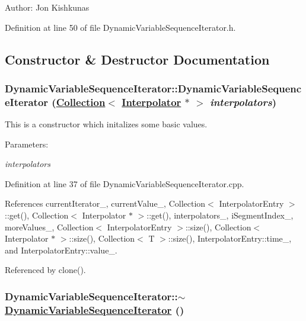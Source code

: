 \begin{Desc}
\item[Author:]Jon Kishkunas \end{Desc}




Definition at line 50 of file Dynamic\-Variable\-Sequence\-Iterator.h.

\subsection{Constructor \& Destructor Documentation}
\hypertarget{classDynamicVariableSequenceIterator_a0}{
\subsubsection[DynamicVariableSequenceIterator]{\setlength{\rightskip}{0pt plus 5cm}Dynamic\-Variable\-Sequence\-Iterator::Dynamic\-Variable\-Sequence\-Iterator (\hyperlink{classCollection}{Collection}$<$ \hyperlink{classInterpolator}{Interpolator} $\ast$ $>$ {\em interpolators})}}
\label{classDynamicVariableSequenceIterator_a0}


This is a constructor which initalizes some basic values. \begin{Desc}
\item[Parameters:]
\begin{description}
\item[{\em interpolators}]\end{description}
\end{Desc}


Definition at line 37 of file Dynamic\-Variable\-Sequence\-Iterator.cpp.

References current\-Iterator\_\-, current\-Value\_\-, Collection$<$ Interpolator\-Entry $>$::get(), Collection$<$ Interpolator $\ast$ $>$::get(), interpolators\_\-, i\-Segment\-Index\_\-, more\-Values\_\-, Collection$<$ Interpolator\-Entry $>$::size(), Collection$<$ Interpolator $\ast$ $>$::size(), Collection$<$ T $>$::size(), Interpolator\-Entry::time\_\-, and Interpolator\-Entry::value\_\-.

Referenced by clone().\hypertarget{classDynamicVariableSequenceIterator_a1}{
\subsubsection[$\sim$DynamicVariableSequenceIterator]{\setlength{\rightskip}{0pt plus 5cm}Dynamic\-Variable\-Sequence\-Iterator::$\sim$\hyperlink{classDynamicVariableSequenceIterator}{Dynamic\-Variable\-Sequence\-Iterator} ()}}
\label{classDynamicVariableSequenceIterator_a1}



